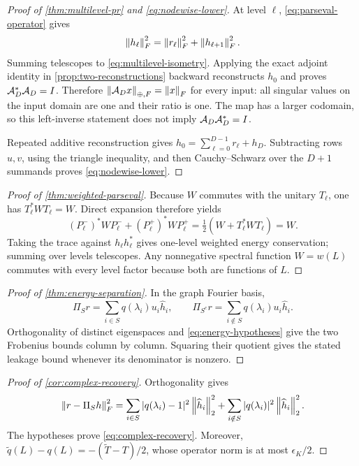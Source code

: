 \begin{proof}[Proof of \cref{thm:multilevel-pr} and
\cref{eq:nodewise-lower}]
At level $\ell$, \cref{eq:parseval-operator} gives
\begin{equation}
 \left\lVert h_\ell\right\rVert_F^2=\left\lVert r_\ell\right\rVert_F^2+
 \left\lVert h_{\ell+1}\right\rVert_F^2.
\end{equation}
Summing telescopes to \cref{eq:multilevel-isometry}.  Applying the exact
adjoint identity in \cref{prop:two-reconstructions} backward reconstructs
$h_0$ and proves $\mathcal A_D^*\mathcal A_D=I$.  Therefore
$\left\lVert \mathcal A_Dx\right\rVert_{\oplus,F}=\left\lVert x\right\rVert_F$ for every input: all singular values
on the input domain are one and their ratio is one.  The map has a larger codomain,
so this left-inverse statement does not imply $\mathcal A_D\mathcal A_D^*=I$.

Repeated additive reconstruction gives
$h_0=\sum_{\ell=0}^{D-1}r_\ell+h_D$.  Subtracting rows $u,v$, using the
triangle inequality, and then Cauchy--Schwarz over the $D+1$ summands proves
\cref{eq:nodewise-lower}.
\end{proof}

\begin{proof}[Proof of \cref{thm:weighted-parseval}]
Because $W$ commutes with the unitary $T_\ell$, one has
$T_\ell^*WT_\ell=W$.  Direct expansion therefore yields
\begin{equation}
 (P_\ell^-)^*WP_\ell^-+(P_\ell^+)^*WP_\ell^+
 =\tfrac12(W+T_\ell^*WT_\ell)=W.
\end{equation}
Taking the trace against $h_\ell h_\ell^*$ gives one-level weighted energy
conservation; summing over levels telescopes.  Any nonnegative spectral
function $W=w(L)$ commutes with every level factor because both are functions
of $L$.
\end{proof}

\begin{proof}[Proof of \cref{thm:energy-separation}]
In the graph Fourier basis,
\begin{equation}
 \Pi_Sr=\sum_{i\in S}q(\lambda_i)u_i\widehat h_i,
 \qquad
 \Pi_{S^c}r=\sum_{i\notin S}q(\lambda_i)u_i\widehat h_i.
\end{equation}
Orthogonality of distinct eigenspaces and \cref{eq:energy-hypotheses} give
the two Frobenius bounds column by column.  Squaring their quotient gives the
stated leakage bound whenever its denominator is nonzero.
\end{proof}

\begin{proof}[Proof of \cref{cor:complex-recovery}]
Orthogonality gives
\begin{equation}
 \left\lVert r-\Pi_Sh\right\rVert_F^2
 =\sum_{i\in S}|q(\lambda_i)-1|^2\left\lVert \widehat h_i\right\rVert_2^2
 +\sum_{i\notin S}|q(\lambda_i)|^2\left\lVert \widehat h_i\right\rVert_2^2.
\end{equation}
The hypotheses prove \cref{eq:complex-recovery}.  Moreover,
$\widetilde q(L)-q(L)=-(\widetilde T-T)/2$, whose operator norm is at most
$\epsilon_K/2$.
\end{proof}

